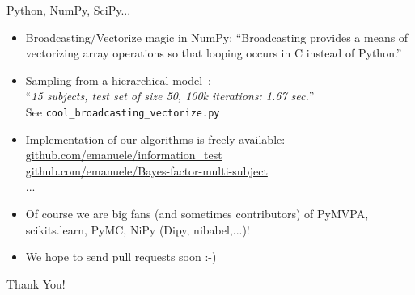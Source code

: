 \documentclass{beamer}
\begin{document}
\begin{frame}{Python, NumPy, SciPy...}
  \begin{itemize}
  \item Broadcasting/Vectorize magic in NumPy: ``Broadcasting provides
    a means of vectorizing array operations so that looping occurs in
    C instead of
    Python.''%
  \item Sampling from a hierarchical model~\cite{olivetti2011bayesian}:\\
  ``\emph{15 subjects, test set of size 50, 100k iterations: \alert{1.67 sec.}}''\\
  See \texttt{cool\_broadcasting\_vectorize.py}\\
  \item Implementation of our algorithms is freely available:\\
    \small{\url{github.com/emanuele/information_test}}\\
    \small{\url{github.com/emanuele/Bayes-factor-multi-subject}}\\
    ...
  \item Of course we are big fans (and sometimes contributors) of
    PyMVPA, scikits.learn, PyMC, NiPy (Dipy, nibabel,...)!
  \item We hope to send pull requests soon :-)
  \end{itemize}
\end{frame}

\begin{frame}
  \begin{center}
    Thank You!
  \end{center}
\end{frame}
\end{document}
